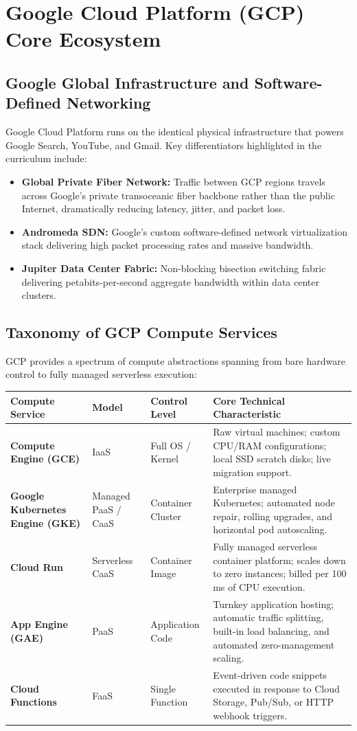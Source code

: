 \documentclass[11pt,a4paper,openany]{report}
\begin{document}
\section{Google Cloud Platform (GCP) Core Ecosystem}
\subsection{Google Global Infrastructure and Software-Defined Networking}
Google Cloud Platform runs on the identical physical infrastructure that powers Google Search, YouTube, and Gmail. Key differentiators highlighted in the curriculum include:
\begin{itemize}[leftmargin=*]
  \item \textbf{Global Private Fiber Network:} Traffic between GCP regions travels across Google's private transoceanic fiber backbone rather than the public Internet, dramatically reducing latency, jitter, and packet loss.
  \item \textbf{Andromeda SDN:} Google's custom software-defined network virtualization stack delivering high packet processing rates and massive bandwidth.
  \item \textbf{Jupiter Data Center Fabric:} Non-blocking bisection switching fabric delivering petabits-per-second aggregate bandwidth within data center clusters.
\end{itemize}

\subsection{Taxonomy of GCP Compute Services}
GCP provides a spectrum of compute abstractions spanning from bare hardware control to fully managed serverless execution:
\begin{center}
\begin{tabularx}{\textwidth}{>{\bfseries}l p{2.2cm} p{2.5cm} X}
\toprule
Compute Service & Model & Control Level & Core Technical Characteristic\\
\midrule
Compute Engine (GCE) & IaaS & Full OS / Kernel & Raw virtual machines; custom CPU/RAM configurations; local SSD scratch disks; live migration support.\\
Google Kubernetes Engine (GKE) & Managed PaaS / CaaS & Container Cluster & Enterprise managed Kubernetes; automated node repair, rolling upgrades, and horizontal pod autoscaling.\\
Cloud Run & Serverless CaaS & Container Image & Fully managed serverless container platform; scales down to zero instances; billed per 100 ms of CPU execution.\\
App Engine (GAE) & PaaS & Application Code & Turnkey application hosting; automatic traffic splitting, built-in load balancing, and automated zero-management scaling.\\
Cloud Functions & FaaS & Single Function & Event-driven code snippets executed in response to Cloud Storage, Pub/Sub, or HTTP webhook triggers.\\
\bottomrule
\end{tabularx}
\end{center}
\end{document}
